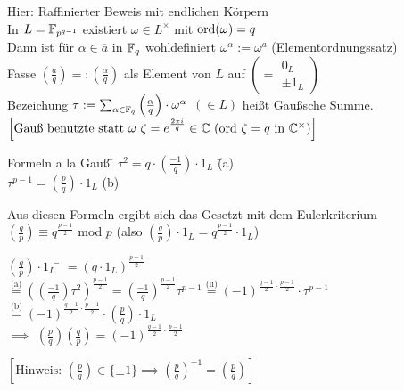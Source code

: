 \documentclass[a4paper,DIV15,BCOR12mm]{article}
\begin{document}
\begin{beweis}
Hier: Raffinierter Beweis mit endlichen Körpern\\
In $L = \mathbb{F}_{p^{q-1}}$ existiert $\omega \in L^\times$ mit $\mathop{\rm ord}\nolimits(\omega)=q$\\
Dann ist für $\alpha \in \overline a$ in $\mathbb{F}_q$ \underline{wohldefiniert} $\omega^\alpha:=\omega^a$ (Elementordnungssatz) \\
Fasse $\left(\frac{a}{q}\right) =: \left(\frac{\alpha}{q}\right)$ als Element von $L$ auf $\left(=\begin{array}{l} 0_L \\ \pm 1_L \end{array}\right)$ \\
Bezeichung $\tau := \sum_{\alpha \in \mathbb{F}_q}\left(\frac{\alpha}{q}\right) \cdot \omega^\alpha$ $(\in L)$ heißt Gaußsche Summe.\\
$\left[ \mbox{Gauß benutzte statt $\omega$ $\zeta=e^\frac{2\pi i}{q} \in \mathbb{C}$ (ord $\zeta=q$ in $\mathbb{C}^\times$)} \right]$ \\
\begin{tabbing}
Formeln a la Gauß \= $\tau^2=q \cdot \left(\frac{-1}{q}\right) \cdot 1_L$ \= (a) \\
                  \> $\tau^{p-1} = \left(\frac{p}{q}\right) \cdot 1_L$    \> (b)
\end{tabbing}
Aus diesen Formeln ergibt sich das Gesetzt mit dem Eulerkriterium \\
$\left(\frac{q}{p}\right) \equiv q^\frac{p-1}{2}$ mod $p$ (also $\left(\frac{q}{p}\right) \cdot 1_L = q^\frac{p-1}{2} \cdot 1_L$)\\
\begin{tabbing}
$\left(\frac{q}{p}\right) \cdot 1_L$ \= $= (q \cdot 1_L)^\frac{p-1}{2}$ \\
                                     \> $\stackrel{\mbox{(a)}}{=} \left(\left(\frac{-1}{q}\right)\tau^2\right)^\frac{p-1}{2} = \left(\frac{-1}{q}\right)^\frac{p-1}{2}\tau^{p-1} \stackrel{\mbox{(ii)}}{=} (-1)^{\frac{q-1}{2} \cdot \frac{p-1}{2}} \cdot \tau^{p-1}$ \\
                                     \> $\stackrel{\mbox{(b)}}{=} (-1)^{\frac{q-1}{2} \cdot \frac{p-1}{2}}\cdot \left(\frac{p}{q}\right) \cdot 1_L$ \\
                                     \> $\implies$ $\left(\frac{p}{q}\right)\left(\frac{q}{p}\right)=(-1)^{\frac{q-1}{2} \cdot \frac{p-1}{2}}$
\end{tabbing}
$\left[\mbox{Hinweis: } \left(\frac{p}{q}\right) \in \{\pm 1 \} \implies \left(\frac{p}{q}\right)^{-1} = \left(\frac{p}{q}\right) \right]$ \\

\end{beweis}
\end{document}
